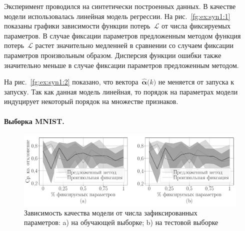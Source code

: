 Эксперимент проводился на синтетически построенных данных. В качестве модели использовалась линейная модель регрессии.
На рис.~\ref{fg:ex:syn1:1} показаны графики зависимости функции потерь~$\mathcal{L}$ от числа фиксируемых параметров. В случае фиксации параметров предложенным методом функция потерь~$\mathcal{L}$ растет значительно медленней в сравнении со случаем фиксации параметров произвольным образом. Дисперсия функции ошибки также значительно меньше в случае фиксации параметров предложенным методом.

На рис.~\ref{fg:ex:syn1:2} показано, что вектора~$\hat{\bm{\alpha}}\bigr(k\bigr)$ не меняется от запуска к запуску. Так как данная модель линейная, то порядок на параметрах модели индуцирует некоторый порядок на множестве признаков.

\paragraph{Выборка MNIST.}

\begin{figure}[h!t]\center
\includegraphics[width=1\textwidth]{results/order/mnist_data_loss}
\caption{Зависимость качества модели от числа зафиксированных параметров: a) на обучающей выборке; b) на тестовой выборке}
\label{fg:ex:mnist:1}
\end{figure}

